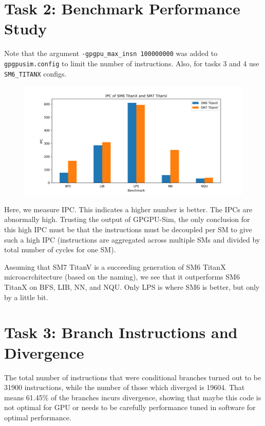 \documentclass{article}
\begin{document}
\section{Task 2: Benchmark Performance Study}
Note that the argument \verb|-gpgpu_max_insn 100000000| was added to \verb|gpgpusim.config| to limit the number of instructions. Also, for tasks 3 and 4 use \verb|SM6_TITANX| configs.
\begin{figure}[H]
    \centerline{\includegraphics[width=6in]{ipc.png}}
\end{figure}

Here, we measure IPC. This indicates a higher number is better. The IPCs are abnormally high. Trusting the output of GPGPU-Sim, the only conclusion for this high IPC must be that the instructions must be decoupled per SM to give such a high IPC (instructions are aggregated across multiple SMs and divided by total number of cycles for one SM). 

Assuming that SM7 TitanV is a succeeding generation of SM6 TitanX microacrchitecture (based on the naming), we see that it outperforms SM6 TitanX on BFS, LIB, NN, and NQU. Only LPS is where SM6 is better, but only by a little bit. 

\section{Task 3: Branch Instructions and Divergence}
The total number of instructions that were conditional branches turned out to be 31900 instructions, while the number of those which diverged is 19604. That means 61.45\% of the branches incurs divergence, showing that maybe this code is not optimal for GPU or needs to be carefully performance tuned in software for optimal performance. 
\end{document}
